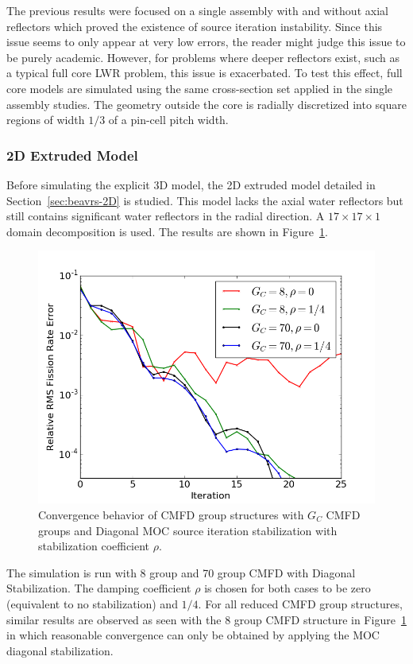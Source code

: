 The previous results were focused on a single assembly with and without axial reflectors which proved the existence of source iteration instability. Since this issue seems to only appear at very low errors, the reader might judge this issue to be purely academic. However, for problems where deeper reflectors exist, such as a typical full core \ac{LWR} problem, this issue is exacerbated. To test this effect, full core models are simulated using the same cross-section set applied in the single assembly studies. The geometry outside the core is radially discretized into square regions of width $1/3$ of a pin-cell pitch width.

\subsubsection{2D Extruded Model}

Before simulating the explicit 3D model, the 2D extruded model detailed in Section~\ref{sec:beavrs-2D} is studied. This model lacks the axial water reflectors but still contains significant water reflectors in the radial direction. A $17 \times 17 \times 1$ domain decomposition is used. The results are shown in Figure~\ref{fig:fc-2D}. 
\begin{figure}[ht!]
	\centering
	\includegraphics[width=0.65\linewidth]{figures/convergence/fc_2D.png}
	\caption{Convergence behavior of \ac{CMFD} group structures with $G_C$ \ac{CMFD} groups and Diagonal \ac{MOC} source iteration stabilization with stabilization coefficient $\rho$.}
	\label{fig:fc-2D}
\end{figure}
The simulation is run with 8 group and 70 group \ac{CMFD} with Diagonal Stabilization. The damping coefficient $\rho$ is chosen for both cases to be zero (equivalent to no stabilization) and $1/4$. For all reduced \ac{CMFD} group structures, similar results are observed as seen with the 8 group \ac{CMFD} structure in Figure~\ref{fig:fc-2D} in which reasonable convergence can only be obtained by applying the \ac{MOC} diagonal stabilization.

